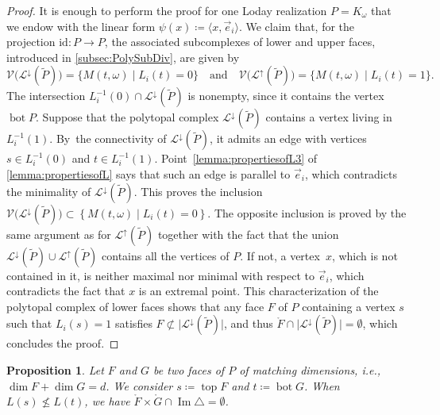 \documentclass[11pt]{article}
\newcommand{\ie}{i.e.,\xspace}
\numberwithin{equation}{section}\providecommand{\No}{}
\let\mathcal\mathscr
\theoremstyle{plain}
\newtheorem{proposition}{Proposition}
\theoremstyle{definition}
\newcommand{\K}{{K}}
\newcommand{\La}{\mathcal{L}}
\DeclareMathOperator{\tp}{top}
\DeclareMathOperator{\bm}{bot}
\newcommand{\ang}[1]{\langle #1\rangle}
\newcommand{\Ve}{\mathcal{V}}
\newcommand{\id}{\mathrm{id}}
\DeclareMathOperator{\im}{\mathrm{Im}}
\begin{document}
\begin{proof}
It is enough to perform the proof for one Loday realization $P=\K_\omega$ that we endow with the linear form
$\psi(x)\coloneqq \ang{x, \vec e_i}$.
We claim that, for the projection $\id : P \to P$, the associated subcomplexes of lower and upper faces, introduced in \cref{subsec:PolySubDiv}, are given by
\[\Ve\big(\La^{\downarrow}(\tilde P)\big)=\{
M(t,\omega)\mid L_i(t)=0
\}
\quad
\text{and}
\quad
\Ve\big(\La^{\uparrow}(\tilde P)\big)=\{
M(t,\omega)\mid L_i(t)=1
\}.
\]
The intersection $L_i^{-1}(0)\cap \La^{\downarrow}(\tilde P)$
is nonempty, since it contains the vertex $\bm P$. Suppose that the polytopal complex
$\La^{\downarrow}(\tilde P)$ contains a vertex living in $L_i^{-1}(1)$. By~the connectivity of $\La^{\downarrow}(\tilde P)$, it admits an edge with vertices $s\in L_i^{-1}(0)$ and $t\in L_i^{-1}(1)$.
Point~\eqref{lemma:propertiesofL3} of \cref{lemma:propertiesofL} says that such an edge is parallel to $\vec e_i$, which contradicts the minimality of $\La^{\downarrow}(\tilde P)$.
This proves the inclusion
$\Ve\big(\La^{\downarrow}(\tilde P)\big)
\subset
\left\{
M(t,\omega)\mid L_i(t)=0
\right\}$.
The opposite inclusion is proved by the same argument as for
$\La^{\uparrow}(\tilde P)$
together with the fact that
the union $\La^{\downarrow}(\tilde P)\cup \La^{\uparrow}(\tilde P)$ contains all the vertices of $P$.
If not, a vertex~$x$, which is not contained in it, is neither maximal nor minimal with respect to $\vec e_i$, which contradicts the fact that $x$ is an extremal point.
This characterization of the polytopal complex of lower faces shows that any face $F$ of $P$ containing a vertex $s$ such that $L_i(s) = 1$ satisfies
$ F\not \subset\vert\La^{\downarrow}(\tilde P)\vert$, and thus
$\mathring F \cap \big\vert\La^{\downarrow}(\tilde P)\big\vert=\emptyset$, which concludes the proof.
\end{proof}

\begin{proposition}\label{prop:FirstExclusion}
Let $F$ and $G$ be two faces of $P$ of matching dimensions, \ie $\dim F+\dim G=d$. We consider
$s\coloneqq \tp F$ and $t\coloneqq \bm G$.
When $L(s)\not\leq L(t)$, we have $\mathring{F}\times \mathring{G}\cap \im\triangle = \emptyset$.
\end{proposition}
\end{document}
